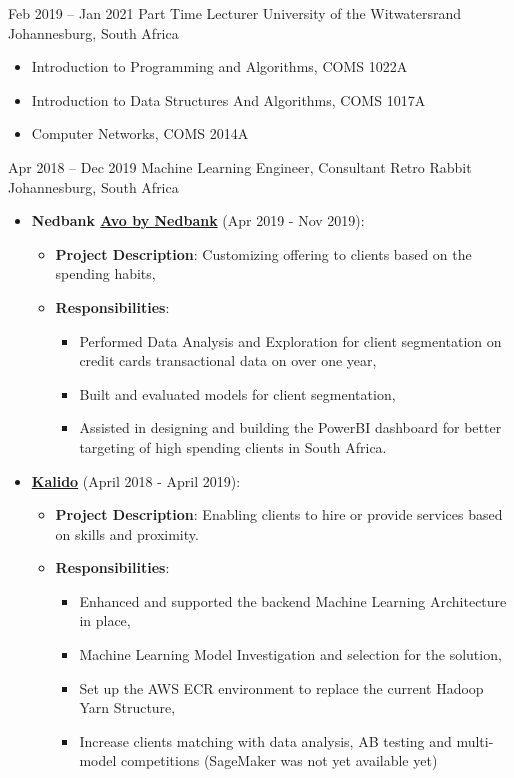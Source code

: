 \documentclass[11pt, letterpaper]{moderncv}        %
\begin{document}
\cventry
{Feb 2019 -- Jan 2021}
{Part Time Lecturer}
{University of the Witwatersrand}
{Johannesburg, South Africa}
{}
{\begin{itemize}%
		\item Introduction to Programming and Algorithms, COMS 1022A
		\item Introduction to Data Structures And Algorithms, COMS 1017A
		\item Computer Networks, COMS 2014A
\end{itemize}}
\cventry
{Apr 2018 -- Dec 2019}
{Machine Learning Engineer, Consultant}
{Retro Rabbit}
{Johannesburg, South Africa}
{}
{\begin{itemize}%
		\item \textbf{Nedbank \href{https://www.nedbank.co.za/content/nedbank/desktop/gt/en/personal/nedbank-money/avo.html}{Avo by Nedbank}} (Apr 2019 - Nov 2019): 
		\begin{itemize}
			\item \textbf{Project Description}: Customizing offering to clients based on the spending habits,
			\item \textbf{Responsibilities}:
			\begin{itemize}
				\item Performed Data Analysis and Exploration for client segmentation on credit cards transactional data on over one year,
				\item Built and evaluated models for client segmentation,
				\item Assisted in designing and building the PowerBI dashboard for better targeting of high spending clients in South Africa. 
			\end{itemize}
		\end{itemize}
		\item \textbf{\href{https://www.kalido.me/}{Kalido}} (April 2018 - April 2019): 
		\begin{itemize}
			\item \textbf{Project Description}: Enabling clients to hire or provide services based on skills and proximity.
			\item \textbf{Responsibilities}:
			\begin{itemize}
			\item Enhanced and supported the backend Machine Learning Architecture in place,
			\item Machine Learning Model Investigation and selection for the solution,
			\item Set up the AWS ECR environment to replace the current Hadoop Yarn Structure,
			\item Increase clients matching with data analysis, AB testing and multi-model competitions (SageMaker was not yet available yet)
		\end{itemize}
		\end{itemize}
	\end{itemize}
}
\end{document}
